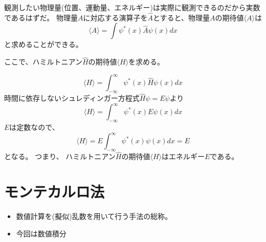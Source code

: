 \documentclass[dvipdfmx]{beamer}
\begin{document}
    \begin{frame}
        観測したい物理量(位置、運動量、エネルギー)は実際に観測できるのだから実数であるはずだ。
        物理量$A$に対応する演算子を$\hat{A}$とすると、物理量$A$の期待値$\langle A \rangle$は
        \begin{equation}
            \langle A \rangle = \int \psi^*(x) \hat{A} \psi(x) dx
        \end{equation}
        と求めることができる。
    \end{frame}

    \begin{frame}
        ここで、ハミルトニアン$\hat{H}$の期待値$\langle H \rangle$を求める。

        \begin{equation}
            \langle H \rangle = \int_{-\infty}^\infty \psi^*(x) \hat{H} \psi(x) dx
        \end{equation}
        時間に依存しないシュレディンガー方程式$\hat{H}\psi = E\psi$より
        \begin{equation}
            \langle H \rangle = \int_{-\infty}^\infty \psi^*(x) E \psi(x) dx
        \end{equation}
        $E$は定数なので、
        \begin{equation}
            \langle H \rangle = E\int_{-\infty}^\infty \psi^*(x)\psi(x) dx = E
        \end{equation}
        となる。
        つまり、
        \alert{ハミルトニアン$\hat{H}$の期待値$\langle H \rangle$はエネルギー$E$}である。
    \end{frame}

    \section{モンテカルロ法}
    \begin{frame}
        \begin{itemize}
            \item 数値計算を(擬似)乱数を用いて行う手法の総称。
            \item 今回は数値積分
        \end{itemize}
    \end{frame}
\end{document}
